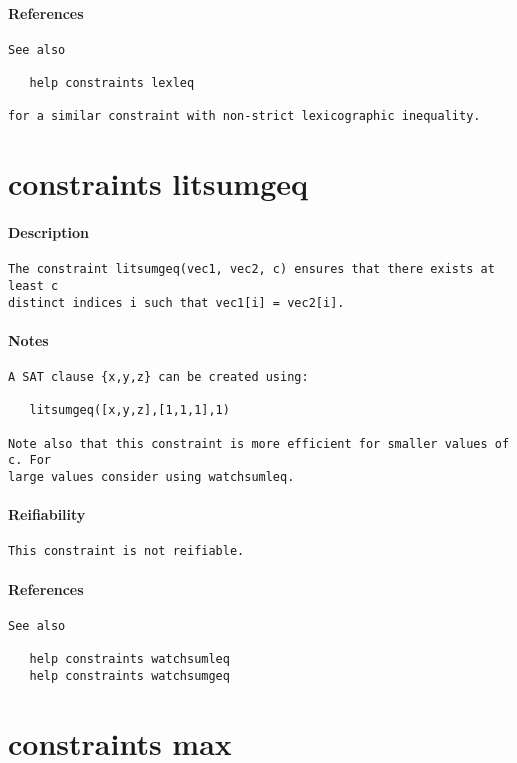 \paragraph{References}
{\footnotesize
\begin{verbatim}
See also

   help constraints lexleq

for a similar constraint with non-strict lexicographic inequality.
\end{verbatim}
}
\section{constraints litsumgeq}
\paragraph{Description}
{\footnotesize
\begin{verbatim}
The constraint litsumgeq(vec1, vec2, c) ensures that there exists at least c
distinct indices i such that vec1[i] = vec2[i].
\end{verbatim}
}
\paragraph{Notes}
{\footnotesize
\begin{verbatim}
A SAT clause {x,y,z} can be created using:

   litsumgeq([x,y,z],[1,1,1],1)

Note also that this constraint is more efficient for smaller values of c. For
large values consider using watchsumleq.
\end{verbatim}
}
\paragraph{Reifiability}
{\footnotesize
\begin{verbatim}
This constraint is not reifiable.
\end{verbatim}
}
\paragraph{References}
{\footnotesize
\begin{verbatim}
See also

   help constraints watchsumleq
   help constraints watchsumgeq
\end{verbatim}
}
\section{constraints max}
